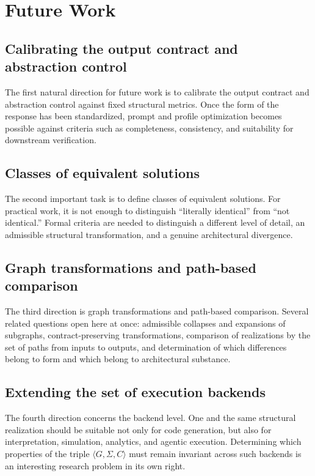 \documentclass[12pt,a4paper]{article}
\begin{document}
\section{Future Work}

\subsection{Calibrating the output contract and abstraction control}

The first natural direction for future work is to calibrate the output contract and abstraction control against fixed structural metrics. Once the form of the response has been standardized, prompt and profile optimization becomes possible against criteria such as completeness, consistency, and suitability for downstream verification.

\subsection{Classes of equivalent solutions}

The second important task is to define classes of equivalent solutions. For practical work, it is not enough to distinguish ``literally identical'' from ``not identical.'' Formal criteria are needed to distinguish a different level of detail, an admissible structural transformation, and a genuine architectural divergence.

\subsection{Graph transformations and path-based comparison}

The third direction is graph transformations and path-based comparison. Several related questions open here at once: admissible collapses and expansions of subgraphs, contract-preserving transformations, comparison of realizations by the set of paths from inputs to outputs, and determination of which differences belong to form and which belong to architectural substance.

\subsection{Extending the set of execution backends}

The fourth direction concerns the backend level. One and the same structural realization should be suitable not only for code generation, but also for interpretation, simulation, analytics, and agentic execution. Determining which properties of the triple $\langle G, \Sigma, C \rangle$ must remain invariant across such backends is an interesting research problem in its own right.
\end{document}

